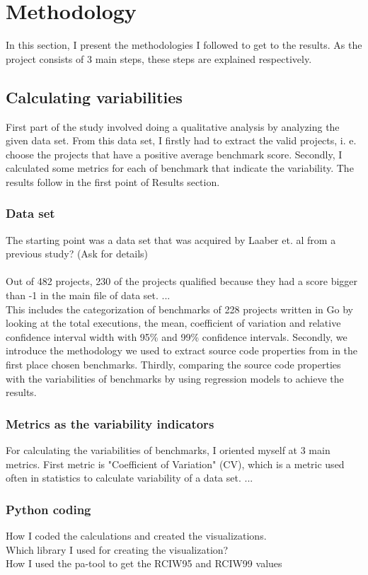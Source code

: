 \documentclass{seal_thesis}
\begin{document}
\chapter{Methodology}
In this section, I present the methodologies I followed to get to the results. As the project consists of 3 main steps, these steps are explained respectively.
\section{Calculating variabilities}
First part of the study involved doing a qualitative analysis by analyzing the given data set. From this data set, I firstly had to extract the valid projects, i. e. choose the projects that have a positive average benchmark score. Secondly, I calculated some metrics for each of benchmark that indicate the variability. The results follow in the first point of Results section.
\subsection{Data set}
The starting point was a data set that was acquired by Laaber et. al from a previous study? (Ask for details) \\
\\
Out of 482 projects, 230 of the projects qualified because they had a score bigger than -1 in the main file of data set. ...
\\
 This includes the categorization of benchmarks of 228 projects written in Go by looking at the total executions, the mean, coefficient of variation and relative confidence interval width with 95\% and 99\% confidence intervals. Secondly, we introduce the methodology we used to extract source code properties from in the first place chosen benchmarks. Thirdly, comparing the source code properties with the variabilities of benchmarks by using regression models to achieve the results.
 
\subsection{Metrics as the variability indicators}
For calculating the variabilities of benchmarks, I oriented myself at 3 main metrics. First metric is "Coefficient of Variation" (CV), which is a metric used often in statistics to calculate variability of a data set. ...

\subsection{Python coding}
How I coded the calculations and created the visualizations. \\
Which library I used for creating the visualization? \\
How I used the pa-tool to get the RCIW95 and RCIW99 values \\
\end{document}
